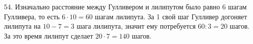 54. Изначально расстояние между Гулливером и лилипутом было равно 6 шагам Гулливера, то есть $6\cdot10=60$ шагам лилипута. За 1 свой шаг Гулливер догоняет лилипута на $10-7=3$ шага лилипута, значит ему потребуется $60:3=20$ шагов. За это время лилипут сделает $20\cdot7=140$ шагов.\\
